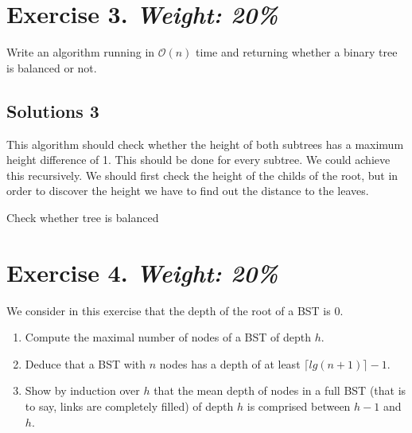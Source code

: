 \documentclass{article}
\begin{document}
\newpage
\section*{Exercise 3. \textit{Weight: 20\%}}
Write an algorithm running in $\mathcal{O}(n)$ time and returning whether a binary tree is balanced or not.

\subsection*{Solutions 3}
This algorithm should check whether the height of both subtrees has a maximum height difference of 1. This should be done for every subtree. We could achieve this recursively. We should first check the height of the childs of the root, but in order to discover the height we have to find out the distance to the leaves.

\begin{algorithm}[h!]
  \DontPrintSemicolon
    \caption{Check whether tree is balanced}
\end{algorithm}

\newpage
\section*{Exercise 4. \textit{Weight: 20\%}}
We consider in this exercise that the depth of the root of a BST is 0.
\begin{enumerate}
  \item Compute the maximal number of nodes of a BST of depth $h$.
  \item Deduce that a BST with $n$ nodes has a depth of at least $\lceil lg(n+1) \rceil - 1$.
  \item Show by induction over $h$ that the mean depth of nodes in a full BST (that is to say, links are completely filled) of depth $h$ is comprised between $h-1$ and $h$.
\end{enumerate}
\end{document}
